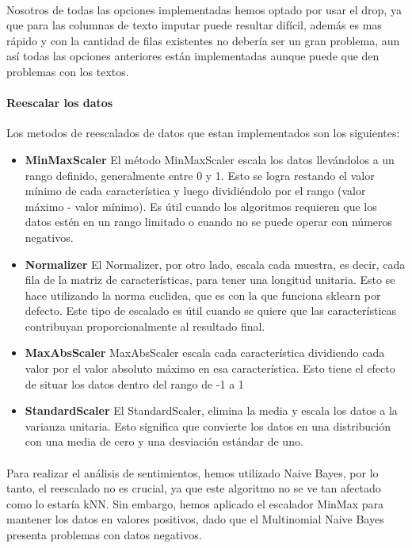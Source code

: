 \documentclass{report}
\begin{document}
{{                \paragraph*{}{
                    Nosotros de todas las opciones implementadas hemos optado por usar el drop, ya que para las columnas de texto imputar puede resultar difícil, además es mas rápido y con la cantidad de filas existentes no debería ser un gran problema, aun así todas las opciones anteriores están implementadas aunque puede que den problemas con los textos.
                }
                \paragraph*{Reescalar los datos} {Los metodos de reescalados de datos que estan implementados son los siguientes:}
                \begin{itemize}
                    \item \textbf{MinMaxScaler}   
                        El método MinMaxScaler escala los datos llevándolos a un rango definido, generalmente entre 0 y 1. Esto se logra restando el valor mínimo de cada característica y luego dividiéndolo por el rango (valor máximo - valor mínimo). Es útil cuando los algoritmos requieren que los datos estén en un rango limitado o cuando no se puede operar con números negativos.
                    \item \textbf{Normalizer}   
                        El Normalizer, por otro lado, escala cada muestra, es decir, cada fila de la matriz de características, para tener una longitud unitaria. Esto se hace utilizando la norma euclidea, que es con la que funciona sklearn por defecto. Este tipo de escalado es útil cuando se quiere que las características contribuyan proporcionalmente al resultado final.
                    \item \textbf{MaxAbsScaler}   
                        MaxAbsScaler escala cada característica dividiendo cada valor por el valor absoluto máximo en esa característica. Esto tiene el efecto de situar los datos dentro del rango de -1 a 1
                    \item \textbf{StandardScaler}   
                        El StandardScaler, elimina la media y escala los datos a la varianza unitaria. Esto significa que convierte los datos en una distribución con una media de cero y una desviación estándar de uno.
                \end{itemize}
                \paragraph*{}{
                    Para realizar el análisis de sentimientos, hemos utilizado Naive Bayes, por lo tanto, el reescalado no es crucial, ya que este algoritmo no se ve tan afectado como lo estaría kNN. Sin embargo, hemos aplicado el escalador MinMax para mantener los datos en valores positivos, dado que el Multinomial Naive Bayes presenta problemas con datos negativos.
                }
}}
\end{document}
